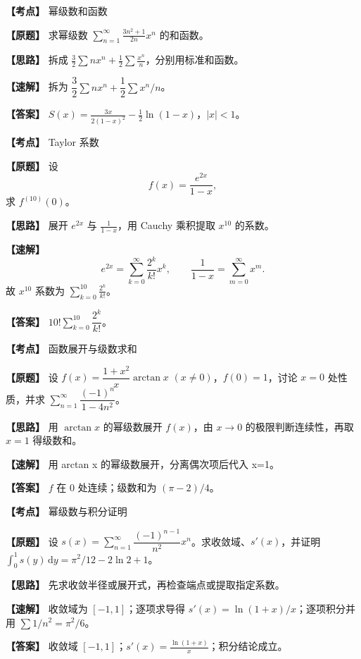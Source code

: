 ﻿\documentclass[11pt,a4paper,UTF8]{ctexart}
\newcommand{\dd}{\,\mathrm d}
\begin{document}
\begin{answerbox}[2023--2024 二-5]
\textbf{【考点】} 幂级数和函数

\textbf{【原题】} 求幂级数 $\displaystyle \sum_{n=1}^{\infty}\frac{3n^2+1}{2n}x^n$ 的和函数。

\textbf{【思路】} 拆成 $\frac32\sum nx^n+\frac12\sum \frac{x^n}{n}$，分别用标准和函数。

\textbf{【速解】} 拆为 $\dfrac32\sum nx^n+\dfrac12\sum x^n/n$。

\textbf{【答案】} $\displaystyle S(x)=\frac{3x}{2(1-x)^2}-\frac12\ln(1-x)$，$|x|<1$。
\end{answerbox}

\begin{answerbox}[2022--2023 三-11]
\textbf{【考点】} Taylor 系数

\textbf{【原题】} 设
\[
f(x)=\frac{e^{2x}}{1-x},
\]
求 $f^{(10)}(0)$。

\textbf{【思路】} 展开 $e^{2x}$ 与 $\frac1{1-x}$，用 Cauchy 乘积提取 $x^{10}$ 的系数。

\textbf{【速解】}
\[
e^{2x}=\sum_{k=0}^{\infty}\frac{2^k}{k!}x^k,\qquad
\frac1{1-x}=\sum_{m=0}^{\infty}x^m.
\]
故 $x^{10}$ 系数为 $\displaystyle\sum_{k=0}^{10}\frac{2^k}{k!}$。

\textbf{【答案】} $10!\displaystyle\sum_{k=0}^{10}\dfrac{2^k}{k!}$。
\end{answerbox}

\begin{answerbox}[2021--2022 三-11]
\textbf{【考点】} 函数展开与级数求和

\textbf{【原题】} 设 $f(x)=\dfrac{1+x^2}{x}\arctan x$ $(x\ne0)$，$f(0)=1$，讨论 $x=0$ 处性质，并求 $\displaystyle\sum_{n=1}^{\infty}\dfrac{(-1)^n}{1-4n^2}$。

\textbf{【思路】} 用 $\arctan x$ 的幂级数展开 $f(x)$，由 $x\to0$ 的极限判断连续性，再取 $x=1$ 得级数和。

\textbf{【速解】} 用 arctan x 的幂级数展开，分离偶次项后代入 x=1。

\textbf{【答案】} $f$ 在 $0$ 处连续；级数和为 $(\pi-2)/4$。
\end{answerbox}

\begin{answerbox}[2020--2021 五-15]
\textbf{【考点】} 幂级数与积分证明

\textbf{【原题】} 设 $s(x)=\displaystyle\sum_{n=1}^{\infty}\dfrac{(-1)^{n-1}}{n^2}x^n$。求收敛域、$s'(x)$，并证明 $\displaystyle\int_0^1s(y)\dd y=\pi^2/12-2\ln2+1$。

\textbf{【思路】} 先求收敛半径或展开式，再检查端点或提取指定系数。

\textbf{【速解】} 收敛域为 $[-1,1]$；逐项求导得 $s'(x)=\ln(1+x)/x$；逐项积分并用 $\sum1/n^2=\pi^2/6$。

\textbf{【答案】} 收敛域 $[-1,1]$；$\displaystyle s'(x)=\frac{\ln(1+x)}{x}$；积分结论成立。
\end{answerbox}
\end{document}
